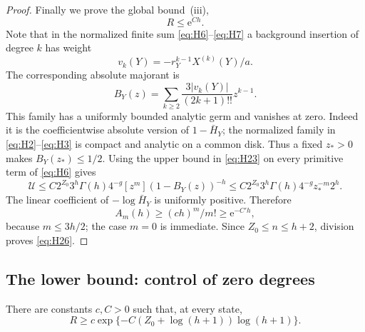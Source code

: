 \begin{proof}
Finally we prove the global bound~(iii), \begin{equation}
R\le \mathrm{e}^{Ch}.
\label{eq:H26}
\end{equation} Note that in the normalized finite sum \eqref{eq:H6}--\eqref{eq:H7} a
background insertion of degree \(k\) has weight \[
v_k(Y)=-r_Y^{k-1}X^{(k)}(Y)/a.
\] The corresponding absolute majorant is \[
B_Y(z)=\sum_{k\ge2}\frac{3|v_k(Y)|}{(2k+1)!!}z^{k-1}.
\] This family has a uniformly bounded analytic germ and vanishes at
zero. Indeed it is the coefficientwise absolute version of \(1-\bar H_Y\);
the normalized family in \eqref{eq:H2}--\eqref{eq:H3} is compact and analytic on a common
disk. Thus a fixed \(z_*>0\) makes \(B_Y(z_*)\le1/2\). Using the upper
bound in \eqref{eq:H23} on every primitive term of \eqref{eq:H6} gives \[
\mathcal U\le
C2^{Z_0}3^h\Gamma(h)4^{-g}[z^m](1-B_Y(z))^{-h}
\le C2^{Z_0}3^h\Gamma(h)4^{-g}z_*^{-m}2^h.
\] The linear coefficient of \(-\log \bar H_Y\) is uniformly positive.
Therefore \[
A_m(h)\ge (ch)^m/m!\ge \mathrm{e}^{-C'h},
\] because \(m\le3h/2\); the case \(m=0\) is immediate. Since
\(Z_0\le n\le h+2\), division proves \eqref{eq:H26}.
\end{proof}

\subsection{The lower bound: control of zero degrees}\label{lower-comparison-by-controlling-only-zeros}

\begin{lemma}\label{lem:lower}
There are constants \(c,C>0\) such that, at every state,
\[
 R\ge c\exp\{-C(Z_0+\log(h+1))\log(h+1)\}.
\]
\end{lemma}

